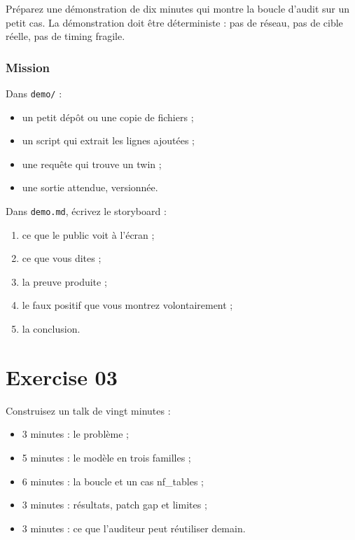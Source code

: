 \documentclass{training}
\begin{document}
Préparez une démonstration de dix minutes qui montre la boucle d'audit sur
un petit cas. La démonstration doit être déterministe : pas de réseau, pas
de cible réelle, pas de timing fragile.

\subsection*{Mission}

Dans \texttt{demo/} :

\begin{itemize}
  \item un petit dépôt ou une copie de fichiers ;
  \item un script qui extrait les lignes ajoutées ;
  \item une requête qui trouve un twin ;
  \item une sortie attendue, versionnée.
\end{itemize}

Dans \texttt{demo.md}, écrivez le storyboard :

\begin{enumerate}
  \item ce que le public voit à l'écran ;
  \item ce que vous dites ;
  \item la preuve produite ;
  \item le faux positif que vous montrez volontairement ;
  \item la conclusion.
\end{enumerate}

\chapter{Exercise 03}
\makeheaderfiles

Construisez un talk de vingt minutes :

\begin{itemize}
  \item 3 minutes : le problème ;
  \item 5 minutes : le modèle en trois familles ;
  \item 6 minutes : la boucle et un cas nf\_tables ;
  \item 3 minutes : résultats, patch gap et limites ;
  \item 3 minutes : ce que l'auditeur peut réutiliser demain.
\end{itemize}
\end{document}
